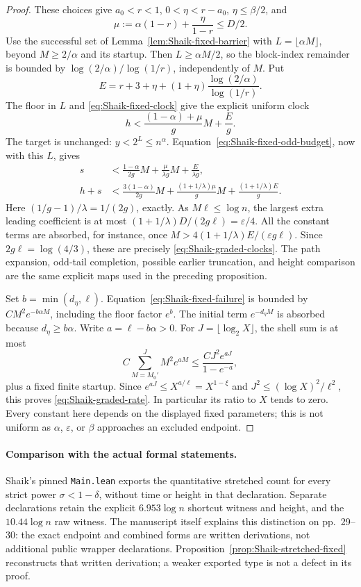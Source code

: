 \begin{proof}
These choices give \(a_0<r<1\), \(0<\eta<r-a_0\),
\(\eta\le\beta/2\), and
\[
 \mu:=\alpha(1-r)+\frac{\eta}{1-r}\le D/2.
\]
Use the successful set of Lemma~\ref{lem:Shaik-fixed-barrier} with
\(L=\lfloor\alpha M\rfloor\), beyond \(M\ge2/\alpha\) and its startup.
Then \(L\ge\alpha M/2\), so the block-index remainder is bounded by
\(\log(2/\alpha)/\log(1/r)\), independently of \(M\).
Put
\[
 E=r+3+\eta+(1+\eta)\frac{\log(2/\alpha)}{\log(1/r)}.
\]
The floor in \(L\) and \eqref{eq:Shaik-fixed-clock} give the explicit
uniform clock
\[
 h<\frac{(1-\alpha)+\mu}{g}M+\frac Eg.
\]
The target is unchanged: \(y<2^L\le n^\alpha\).
Equation~\eqref{eq:Shaik-fixed-odd-budget}, now with this \(L\), gives
\begin{align*}
 s&<\frac{1-\alpha}{2g}M+\frac{\mu}{\lambda g}M+\frac E{\lambda g},\\
 h+s&<\frac{3(1-\alpha)}{2g}M+
         \frac{(1+1/\lambda)\mu}{g}M+
         \frac{(1+1/\lambda)E}{g}.
\end{align*}
Here \((1/g-1)/\lambda=1/(2g)\), exactly.
As \(M\ell\le\log n\), the largest extra leading coefficient is at most
\((1+1/\lambda)D/(2g\ell)=\varepsilon/4\).
All the constant terms are absorbed, for instance, once
\(M>4(1+1/\lambda)E/(\varepsilon g\ell)\).
Since \(2g\ell=\log(4/3)\), these are precisely
\eqref{eq:Shaik-graded-clocks}.
The path expansion, odd-tail completion, possible earlier truncation,
and height comparison are the same explicit maps used in the preceding
proposition.

Set \(b=\min(d_\eta,\ell)\).
Equation~\eqref{eq:Shaik-fixed-failure} is bounded by
\(C M^2e^{-b\alpha M}\), including the floor factor \(e^b\).
The initial term \(e^{-d_\eta M}\) is absorbed because
\(d_\eta\ge b\alpha\).
Write \(a=\ell-b\alpha>0\).
For \(J=\lfloor\log_2X\rfloor\), the shell sum is at most
\[
 C\sum_{M=M_0'}^J M^2e^{aM}
 \le \frac{CJ^2e^{aJ}}{1-e^{-a}},
\]
plus a fixed finite startup. Since
\(e^{aJ}\le X^{a/\ell}=X^{1-\xi}\) and
\(J^2\le(\log X)^2/\ell^2\), this proves
\eqref{eq:Shaik-graded-rate}.
In particular its ratio to \(X\) tends to zero. Every constant here
depends on the displayed fixed parameters; this is not uniform as
\(\alpha\), \(\varepsilon\), or \(\beta\) approaches an excluded endpoint.
\end{proof}

\paragraph{Comparison with the actual formal statements.}
Shaik's pinned \texttt{Main.lean} exports the quantitative stretched
count for every strict power \(\sigma<1-\delta\), without time or
height in that declaration. Separate declarations retain the explicit
\(6.953\log n\) shortcut witness and height, and the \(10.44\log n\)
raw witness. The manuscript itself explains this distinction on
pp.~29--30: the exact endpoint and combined forms are written
derivations, not additional public wrapper declarations.
Proposition~\ref{prop:Shaik-stretched-fixed} reconstructs that written
derivation; a weaker exported type is not a defect in its proof.

